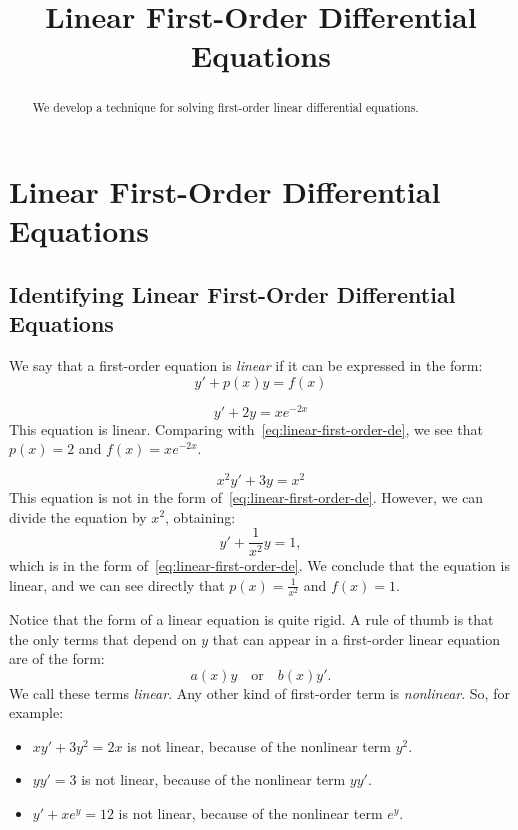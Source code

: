 \documentclass{ximera}
\title{Linear First-Order Differential Equations}
\begin{document}
\begin{abstract}
We develop a technique for solving first-order linear differential equations.
\end{abstract}

\maketitle

\section*{Linear First-Order Differential Equations}
\subsection*{Identifying Linear First-Order Differential Equations}

We say that a first-order equation is \textit{linear} if it can be expressed in the form:
\begin{equation}
\label{eq:linear-first-order-de}
y'+p(x)y=f(x)
\end{equation}
\begin{example}\label{ex:linearex1}
$$y'+2y=xe^{-2x}$$
This equation is linear. Comparing with~\eqref{eq:linear-first-order-de}, we see that $p(x)=2$ and $f(x)=xe^{-2x}$.
\end{example}

\begin{example}\label{ex:linearex2}
$$x^2y'+3y=x^2$$
This equation is not in the form of~\eqref{eq:linear-first-order-de}. However, we can divide the equation by $x^2$, obtaining:
$$
y'+\frac{1}{x^2}y=1,
$$
which is in the form of~\eqref{eq:linear-first-order-de}. We conclude that the equation is linear, and we can see directly that $p(x)=\frac{1}{x^2}$ and $f(x)=1$.
\end{example}
Notice that the form of a linear equation is quite rigid. A rule of thumb is that the only terms that depend on $y$ that can appear in a first-order linear equation are of the form:
\[
a(x)y\quad\text{or}\quad b(x)y'.
\]
We call these terms \textit{linear}. Any other kind of first-order term is \textit{nonlinear}. So, for example:
\begin{itemize}
\item $\displaystyle xy'+3y^2=2x$ is not linear, because of the nonlinear term $y^2$.
\item $\displaystyle yy' = 3$ is not linear, because of the nonlinear term $yy'$.
\item $\displaystyle y'+xe^y=12$ is not linear, because of the nonlinear term $e^y$.
\end{itemize}
\end{document}
